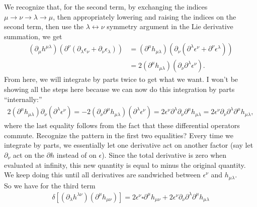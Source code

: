 \documentclass{book}
\theoremstyle{definition}
\newcommand{\p}{\partial}
\newcommand{\nn}{\nonumber}
\begin{document}
We recognize that, for the second term, by exchanging the indices  $\mu \to \nu \to \lambda \to \mu$, then appropriately lowering and raising the indices on the second term, then use the $\lambda \leftrightarrow \nu$ symmetry argument in the Lie derivative summation, we get
\begin{align}
(\p_\mu h^{\mu\lambda})(\p^\nu(\p_\lambda \epsilon_\nu + \p_\nu \epsilon_\lambda)) &= (\p^\mu h_{\mu\lambda})(\p_\nu(\p^\lambda \epsilon^\nu + \p^\nu \epsilon^\lambda))\nn\\
&= 2(\p^\mu h_{\mu\lambda})(\p_\nu\p^\lambda \epsilon^\nu).
\end{align}
From here, we will integrate by parts twice to get what we want. I won't be showing all the steps here because we can now do this integration by parts ``internally:''
\begin{align}
2(\p^\mu h_{\mu\lambda})\p_\nu (\p^\lambda \epsilon^\nu) = -2(\p_\nu\p^\mu h_{\mu\lambda})(\p^\lambda \epsilon^\nu) = 2\epsilon^\nu \p^\lambda \p_\nu \p^\mu h_{\mu\lambda} = 2\epsilon^\nu \p_\nu \p^\lambda  \p^\mu h_{\mu\lambda},
\end{align} 
where the last equality follows from the fact that these differential operators commute. Recognize the pattern in the first two equalities? Every time we integrate by parts, we essentially let one derivative act on another factor (say let $\p_\nu$ act on the $\p h$ instead of on $\epsilon$). Since the total derivative is zero when evaluated at infinity, this new quantity is equal to minus the original quantity. We keep doing this until all derivatives are sandwiched between $\epsilon^\nu$ and $h_{\mu\lambda}$. \\

So we have for the third term
\begin{align}
\boxed{\delta[(\p_\lambda h^{\lambda \nu})( \p^\mu h_{\mu\nu})] = 2\epsilon^\nu\square\p^\mu h_{\mu\nu} + 2\epsilon^\nu \p_\nu \p^\lambda  \p^\mu h_{\mu\lambda}}
\end{align}
\end{document}
